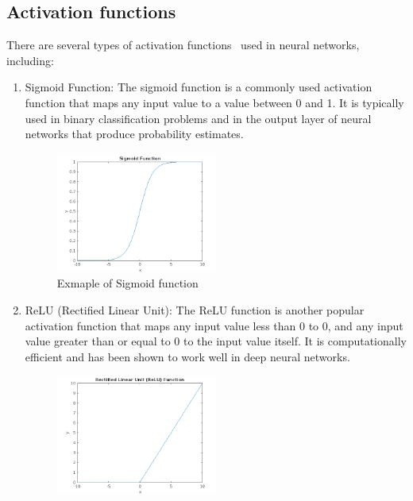     \subsection{Activation functions} \label{subsec:nnaf}
    There are several types of activation functions~\cite{geron2022hands} used in neural networks, including:
    \begin{enumerate}
        \item Sigmoid Function: The sigmoid function is a commonly used activation function that maps any input value to a value between 0 and 1.
        It is typically used in binary classification problems and in the output layer of neural networks that produce probability estimates.
        \begin{center}
            \begin{figure}[!ht]
                \centering
                \includegraphics[width=0.5\textwidth]{figures/sigmoid}
                \caption{Exmaple of Sigmoid function}
                \label{fig:sigmoid}
            \end{figure}
        \end{center}
        \item ReLU (Rectified Linear Unit): The ReLU function is another popular activation function that maps any input value less than 0 to 0, and any
        input value greater than or equal to 0 to the input value itself. It is computationally efficient and has been shown to work
        well in deep neural networks.
        \begin{center}
            \begin{figure}[!ht]
                \centering
                \includegraphics[width=0.5\textwidth]{figures/relu}

\end{figure}
\end{center}
\end{enumerate}
